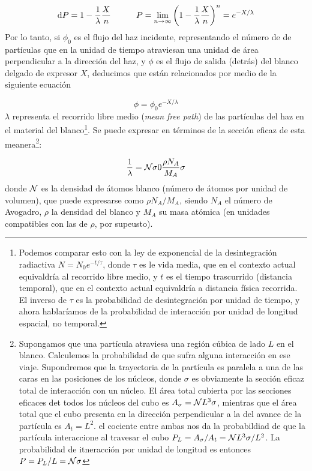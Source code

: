 \begin{equation}
    \mathrm{d} P = 1 - \frac{1}{\lambda} \frac{X}{n} \quad \quad \quad P = \lim_{n\rightarrow \infty} \left( 1 - \frac{1}{\lambda}\frac{X}{n} \right)^n = e^{-X/\lambda}
\end{equation}
Por lo tanto, si $\phi_0$ es el flujo del haz incidente, representando el número de de partículas que en la unidad de tiempo atraviesan una unidad de área perpendicular a la dirección del haz, y $\phi$ es el flujo de salida (detrás) del blanco delgado de expresor $X$, deducimos que están relacionados por medio de la siguiente ecuación 

\begin{equation}
    \phi = \phi_0 e^{-X/\lambda}
\end{equation}
$\lambda$ representa el recorrido libre medio (\textit{mean free path}) de las partículas del haz en el material del blanco\footnote{Podemos comparar esto con la ley de exponencial de la desintegración radiactiva $N=N_0 e^{-t/\tau}$, donde $\tau$ es le vida media, que en el contexto actual equivaldría al recorrido libre medio, y $t$ es el tiempo trascurrido (distancia temporal), que en el contexto actual equivaldría a distancia física recorrida. El inverso de $\tau$ es la probabilidad de desintegración por unidad de tiempo, y ahora hablaríamos de la probabilidad de interacción por unidad de longitud espacial, no temporal.}. Se puede expresar en términos de la sección eficaz de esta meanera\footnote{Supongamos que una partícula atraviesa una región cúbica de lado $L$ en el blanco. Calculemos la probabilidad de que sufra alguna interacción en ese viaje. Supondremos que la trayectoria de la partícula es paralela a una de las caras en las posiciones de los núcleos, donde $\sigma$ es obviamente la sección eficaz total de interacción con un núcleo. El área total cubierta por las secciones eficaces det todos los núcleos del cubo es $A_\sigma = \mathcal{N} L^3 \sigma$, mientras que el área total que el cubo presenta en la dirección perpendicular a la del avance de la partícula es $A_t=L^2$. el cociente entre ambas nos da la probabildiad de que la partícula interaccione al travesar el cubo $P_L  = A_\sigma / A_t = \mathcal{N} L^3 \sigma / L^2$. La probabilidad de itneracción por unidad de longitud es entonces $P=P_L/L=\mathcal{N} \sigma$}:

\begin{equation}
    \frac{1}{\lambda} = \mathcal{N} \sigma 0 \frac{\rho N_A }{M_A} \sigma 
\end{equation}
donde $\mathcal{N}$ es la densidad de átomos blanco (número de átomos por unidad de volumen), que puede expresarse como $\rho N_A /M_A$, siendo $N_A$ el número de Avogadro, $\rho$ la densidad del blanco y $M_A$ su masa atómica (en unidades compatibles con las de $\rho$, por supeusto). 

